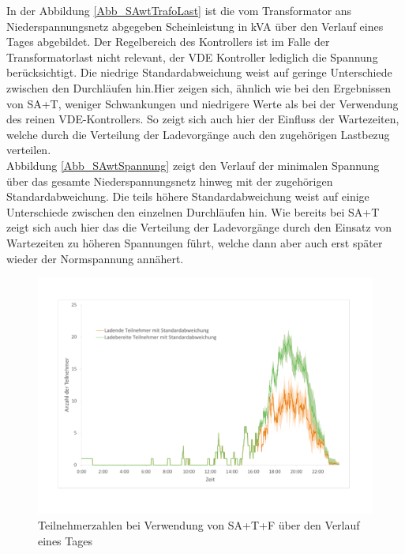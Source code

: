 In der Abbildung \ref{Abb_SAwtTrafoLast} ist die vom Transformator ans Niederspannungsnetz abgegeben Scheinleistung in kVA über den Verlauf eines Tages abgebildet. Der Regelbereich des Kontrollers ist im Falle der Transformatorlast nicht relevant, der VDE Kontroller lediglich die Spannung berücksichtigt. Die niedrige Standardabweichung weist auf geringe Unterschiede zwischen den Durchläufen hin.Hier zeigen sich, ähnlich wie bei den Ergebnissen von SA+T, weniger Schwankungen und niedrigere Werte als bei der Verwendung des reinen VDE-Kontrollers. So zeigt sich auch hier der Einfluss der Wartezeiten, welche durch die Verteilung der Ladevorgänge auch den zugehörigen Lastbezug verteilen.\\
Abbildung \ref{Abb_SAwtSpannung} zeigt den Verlauf der minimalen Spannung über das gesamte Niederspannungsnetz hinweg mit der zugehörigen Standardabweichung. Die teils höhere Standardabweichung weist auf einige Unterschiede zwischen den einzelnen Durchläufen hin. Wie bereits bei SA+T zeigt sich auch hier das die Verteilung der Ladevorgänge durch den Einsatz von Wartezeiten zu höheren Spannungen führt, welche dann aber auch erst später wieder der Normspannung annähert.
\begin{figure}[htb]
\centering
	\includegraphics[scale=0.45]{img/SA_wT/Teilnehmer3.pdf}
	\caption{Teilnehmerzahlen bei Verwendung von SA+T+F über den Verlauf eines Tages}
	\label{Abb_SAwtTeilnehmer}
\end{figure}

